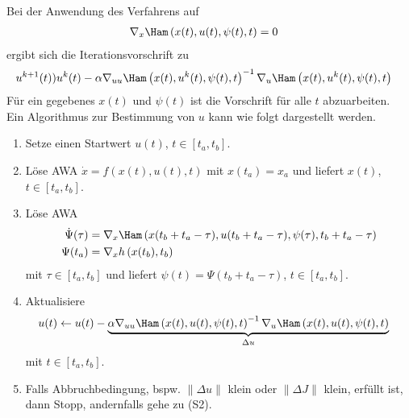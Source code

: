 Bei der Anwendung des Verfahrens auf 
\begin{align*}
 \nabla_x\Ham\left(x(t),u(t),\psi(t),t \right) & = 0
\end{align*}
ergibt sich die Iterationsvorschrift zu
\begin{align*}
	u^{k+1}(t) & ) u^{k}(t) -\alpha\nabla_{uu}\Ham\left(x(t),u^k(t),\psi(t),t \right)^{-1}\nabla_u\Ham\left(x(t),u^k(t),\psi(t),t \right)
\end{align*}
Für ein gegebenes $x(t)$ und $\psi(t)$ ist die Vorschrift für alle $t$ abzuarbeiten.\\
Ein Algorithmus zur Bestimmung von $u$ kann wie folgt dargestellt werden.
\begin{enumerate}[label=(S\arabic*)]
  \item Setze einen Startwert $u(t)$, $t\in[t_a,t_b]$.
  \item Löse \ac{AWA} $\dot{x}=f\left(x(t),u(t),t \right)$ mit $x(t_a)=x_a$ und liefert $x(t)$, $t\in[t_a,t_b]$.
  \item Löse \ac{AWA}
  \begin{align*}
  	\dot{\Psi}(\tau) & = \nabla_x\Ham\left(x(t_b+t_a-\tau),u(t_b+t_a-\tau),\psi(\tau),t_b+t_a-\tau \right)\\
  	\Psi(t_a) & = \nabla_xh\left(x(t_b),t_b \right)
  \end{align*}
  mit $\tau\in[t_a,t_b]$ und liefert $\psi(t)=\Psi\left(t_b + t_a -\tau\right)$, $t\in[t_a,t_b]$.
  \item Aktualisiere 
  \begin{align*}
  	u(t) & \leftarrow u(t)-\underbrace{\alpha\nabla_{uu}\Ham\left(x(t),u(t),\psi(t),t \right)^{-1}\nabla_u\Ham\left(x(t),u(t),\psi(t),t \right)
  	}_{\Delta u}
  \end{align*} 
  mit $t\in[t_a,t_b]$.
  \item Falls Abbruchbedingung, bspw. $\|\Delta u\|$ klein oder $\|\Delta J\|$ klein, erfüllt ist, dann Stopp, andernfalls gehe zu (S2).
\end{enumerate}
